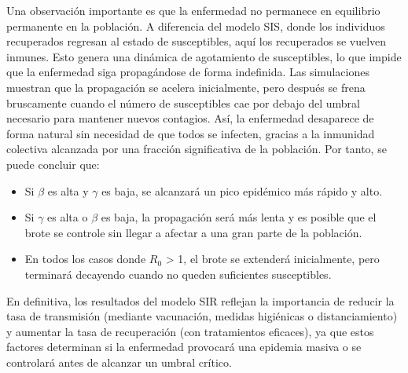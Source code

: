 Una observación importante es que la enfermedad no permanece en equilibrio permanente en la población. A diferencia del modelo SIS, donde los individuos recuperados regresan al estado de susceptibles, aquí los recuperados se vuelven inmunes. Esto genera una dinámica de agotamiento de susceptibles, lo que impide que la enfermedad siga propagándose de forma indefinida.
Las simulaciones muestran que la propagación se acelera inicialmente, pero después se frena bruscamente cuando el número de susceptibles cae por debajo del umbral necesario para mantener nuevos contagios. Así, la enfermedad desaparece de forma natural sin necesidad de que todos se infecten, gracias a la inmunidad colectiva alcanzada por una fracción significativa de la población.
Por tanto, se puede concluir que:
\begin{itemize}
    \item Si $\beta$ es alta y $\gamma$ es baja, se alcanzará un pico epidémico más rápido y alto.
    \item Si $\gamma$ es alta o $\beta$ es baja, la propagación será más lenta y es posible que el brote se controle sin llegar a afectar a una gran parte de la población.
    \item En todos los casos donde $R_0$ > 1, el brote se extenderá inicialmente, pero terminará decayendo cuando no queden suficientes susceptibles.
\end{itemize}
En definitiva, los resultados del modelo SIR reflejan la importancia de reducir la tasa de transmisión (mediante vacunación, medidas higiénicas o distanciamiento) y aumentar la tasa de recuperación (con tratamientos eficaces), ya que estos factores determinan si la enfermedad provocará una epidemia masiva o se controlará antes de alcanzar un umbral crítico.

\vspace{2em}

